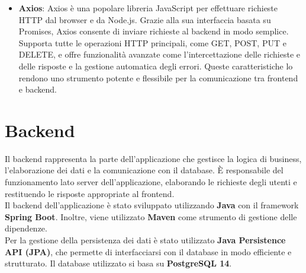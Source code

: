 \begin{itemize}
    \item \textbf{Axios}:  Axios è una popolare libreria JavaScript per effettuare richieste HTTP dal browser e da Node.js. 
    Grazie alla sua interfaccia basata su Promises, Axios consente di inviare richieste al backend in modo semplice.
    Supporta tutte le operazioni HTTP principali, come GET, POST, PUT e DELETE, e offre funzionalità avanzate come 
    l'intercettazione delle richieste e delle risposte e la gestione automatica degli errori. 
    Queste caratteristiche lo rendono uno strumento potente e flessibile per la comunicazione tra frontend e backend. 
    \cite{Axios}

\end{itemize}

\section{Backend} 
Il backend rappresenta la parte dell'applicazione che gestisce la logica di business, 
l'elaborazione dei dati e la comunicazione con il database. 
È responsabile del funzionamento lato server dell'applicazione, 
elaborando le richieste degli utenti e restituendo le risposte appropriate al frontend.
\\
Il backend dell'applicazione è stato sviluppato utilizzando \textbf{Java} con il framework 
\textbf{Spring Boot}. Inoltre, viene utilizzato \textbf{Maven}
come strumento di gestione delle dipendenze. 
\\
Per la gestione della persistenza 
dei dati è stato utilizzato \textbf{Java Persistence API (JPA)}, che permette di interfacciarsi 
con il database in modo efficiente e strutturato. Il database utilizzato si basa su \textbf{PostgreSQL 14}.

